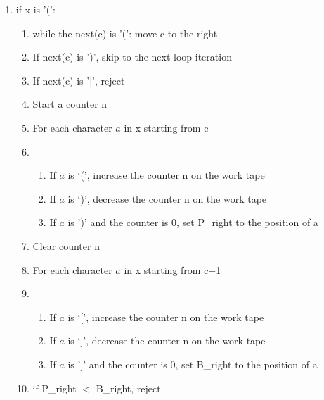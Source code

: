 \documentclass{article}
\begin{document}
\begin{enumerate}[label=]
\begin{enumerate}[label=]
\item if x is '(': 
\begin{enumerate}[label=]
\item while the next(c) is '(': move c to the right
\item If next(c) is ')', skip to the next loop iteration
\item If next(c) is ']', reject
\item Start a counter n
\item For each character $a$ in x starting from c
\item \begin{enumerate}[label=]
\item If $a$ is `(', increase the counter n on the work tape
\item If $a$ is `)', decrease the counter n on the work tape
\item If $a$ is ')' and the counter is 0, set P\_right to the position of a
\end{enumerate}
\item Clear counter n
\item For each character $a$ in x starting from c+1
\item \begin{enumerate}[label=]
\item If $a$ is `[', increase the counter n on the work tape
\item If $a$ is `]', decrease the counter n on the work tape
\item If $a$ is ']' and the counter is 0, set B\_right to the position of a
\end{enumerate}
\item if P\_right $<$ B\_right, reject
\end{enumerate}


\end{enumerate}
\end{enumerate}
\end{document}
